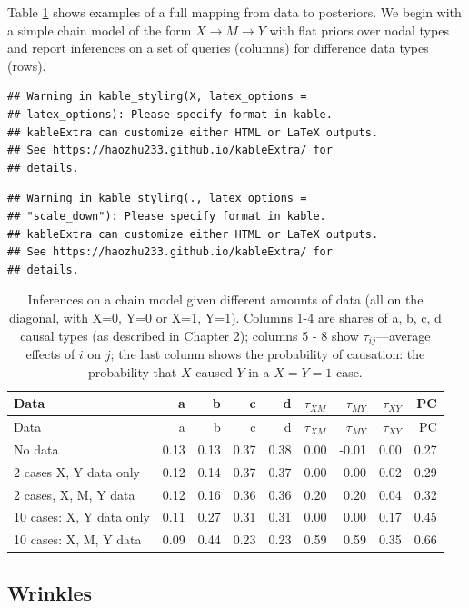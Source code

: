 \documentclass[
  12pt,
]{book}
\begin{document}
Table \ref{tab:chainillustration} shows examples of a full mapping from data to posteriors. We begin with a simple chain model of the form \(X\rightarrow M \rightarrow Y\) with flat priors over nodal types and report inferences on a set of queries (columns) for difference data types (rows).

\begin{verbatim}
## Warning in kable_styling(X, latex_options =
## latex_options): Please specify format in kable.
## kableExtra can customize either HTML or LaTeX outputs.
## See https://haozhu233.github.io/kableExtra/ for
## details.
\end{verbatim}

\begin{verbatim}
## Warning in kable_styling(., latex_options =
## "scale_down"): Please specify format in kable.
## kableExtra can customize either HTML or LaTeX outputs.
## See https://haozhu233.github.io/kableExtra/ for
## details.
\end{verbatim}

\begin{longtable}[]{@{}lrrrrrrrr@{}}
\caption{\label{tab:chainillustration}Inferences on a chain model given different amounts of data (all on the diagonal, with X=0, Y=0 or X=1, Y=1). Columns 1-4 are shares of a, b, c, d causal types (as described in Chapter 2); columns 5 - 8 show \(\tau_{ij}\)---average effects of \(i\) on \(j\); the last column shows the probability of causation: the probability that \(X\) caused \(Y\) in a \(X=Y=1\) case.}\tabularnewline
\toprule
Data & a & b & c & d & \(\tau_{XM}\) & \(\tau_{MY}\) & \(\tau_{XY}\) & PC \\
\midrule
\endfirsthead
\toprule
Data & a & b & c & d & \(\tau_{XM}\) & \(\tau_{MY}\) & \(\tau_{XY}\) & PC \\
\midrule
\endhead
No data & 0.13 & 0.13 & 0.37 & 0.38 & 0.00 & -0.01 & 0.00 & 0.27 \\
2 cases X, Y data only & 0.12 & 0.14 & 0.37 & 0.37 & 0.00 & 0.00 & 0.02 & 0.29 \\
2 cases, X, M, Y data & 0.12 & 0.16 & 0.36 & 0.36 & 0.20 & 0.20 & 0.04 & 0.32 \\
10 cases: X, Y data only & 0.11 & 0.27 & 0.31 & 0.31 & 0.00 & 0.00 & 0.17 & 0.45 \\
10 cases: X, M, Y data & 0.09 & 0.44 & 0.23 & 0.23 & 0.59 & 0.59 & 0.35 & 0.66 \\
\bottomrule
\end{longtable}

\hypertarget{wrinkles}{%
\subsection{Wrinkles}\label{wrinkles}}
\end{document}
